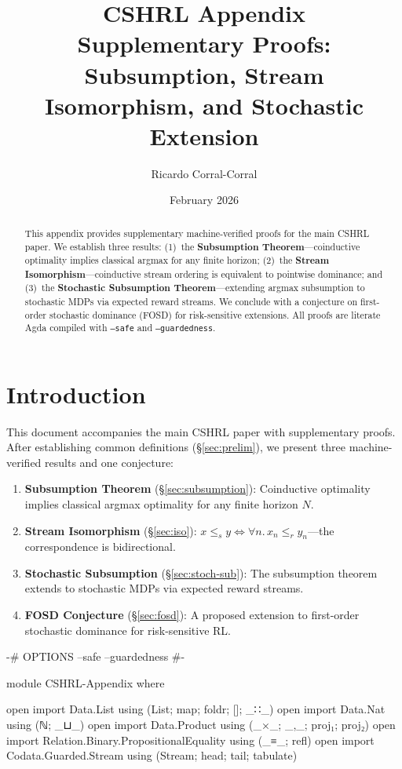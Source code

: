 \documentclass[9pt,a4paper]{article}
\title{\textbf{CSHRL Appendix} \\
Supplementary Proofs: Subsumption, Stream Isomorphism, and Stochastic Extension}
\author{Ricardo Corral-Corral}
\date{February 2026}
\theoremstyle{plain}
\theoremstyle{definition}
\theoremstyle{remark}
\begin{document}
\maketitle

\begin{abstract}
This appendix provides supplementary machine-verified proofs for the main CSHRL paper.
We establish three results:
(1)~the \textbf{Subsumption Theorem}---coinductive optimality implies classical argmax for any finite horizon;
(2)~the \textbf{Stream Isomorphism}---coinductive stream ordering is equivalent to pointwise dominance;
and (3)~the \textbf{Stochastic Subsumption Theorem}---extending argmax subsumption to stochastic MDPs via expected reward streams.
We conclude with a conjecture on first-order stochastic dominance (FOSD) for risk-sensitive extensions.
All proofs are literate Agda compiled with \texttt{--safe} and \texttt{--guardedness}.
\end{abstract}

\section{Introduction}

This document accompanies the main CSHRL paper with supplementary proofs.
After establishing common definitions (\S\ref{sec:prelim}), we present three machine-verified results and one conjecture:
\begin{enumerate}
\item \textbf{Subsumption Theorem} (\S\ref{sec:subsumption}): Coinductive optimality implies classical argmax optimality for any finite horizon $N$.
\item \textbf{Stream Isomorphism} (\S\ref{sec:iso}): $x \le_s y \Longleftrightarrow \forall n.\, x_n \le_r y_n$---the correspondence is bidirectional.
\item \textbf{Stochastic Subsumption} (\S\ref{sec:stoch-sub}): The subsumption theorem extends to stochastic MDPs via expected reward streams.
\item \textbf{FOSD Conjecture} (\S\ref{sec:fosd}): A proposed extension to first-order stochastic dominance for risk-sensitive RL.
\end{enumerate}

\begin{code}
{-# OPTIONS --safe --guardedness #-}

module CSHRL-Appendix where

open import Data.List using (List; map; foldr; []; _∷_)
open import Data.Nat using (ℕ; _⊔_)
open import Data.Product using (_×_; _,_; proj₁; proj₂)
open import Relation.Binary.PropositionalEquality using (_≡_; refl)
open import Codata.Guarded.Stream using (Stream; head; tail; tabulate)
\end{code}
\end{document}
